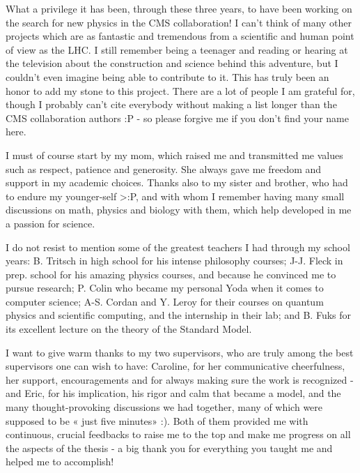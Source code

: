 \emptypage


What a privilege it has been, through these three years, to have been working on
the search for new physics in the CMS collaboration! I can't think of many other
projects which are as fantastic and tremendous from a scientific and human point
of view as the LHC. I still remember being a teenager and reading or hearing at
the television about the construction and science behind this adventure, but I
couldn't even imagine being able to contribute to it. This has truly been an
honor to add my stone to this project. There are a lot of people I am grateful
for, though I probably can't cite everybody without making a list longer than
the CMS collaboration authors :P - so please forgive me if you don't find your
name here.

I must of course start by my mom, which raised me and transmitted me values such
as respect, patience and generosity. She always gave me freedom and support in
my academic choices.  Thanks also to my sister and brother, who had to endure my
younger-self >:P, and with whom I remember having many small discussions on
math, physics and biology with them, which help developed in me a passion for
science.

I do not resist to mention some of the greatest teachers I had through my school
years: B. Tritsch in high school for his intense philosophy courses; J-J. Fleck
in prep. school for his amazing physics courses, and because he convinced me to
pursue research; P. Colin who became my personal Yoda when it comes to computer
science; A-S. Cordan and Y. Leroy for their courses on quantum physics and
scientific computing, and the internship in their lab; and B. Fuks for its
excellent lecture on the theory of the Standard Model.

I want to give warm thanks to my two supervisors, who are truly among the best
supervisors one can wish to have: Caroline, for her communicative cheerfulness,
her support, encouragements and for always making sure the work is recognized -
and Eric, for his implication, his rigor and calm that became a model, and the
many thought-provoking discussions we had together, many of which were supposed
to be « just five minutes» :). Both of them provided me with continuous, crucial
feedbacks to raise me to the top and make me progress on all the aspects of the
thesis - a big thank you for everything you taught me and helped me to
accomplish!


